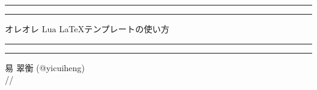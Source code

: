 %
%

\begin{titlepage}
  \centering%
  \vspace*{8\baselineskip}
  \rule{\textwidth}{2pt}\vspace*{-\baselineskip}\vspace*{4pt}
  \rule{\textwidth}{1pt}%
  \vspace*{\baselineskip}%
  {\Huge オレオレ $\mathrm{Lua}$ \LaTeX テンプレートの使い方}%
  \vspace*{0.5\baselineskip}%
  \rule{\textwidth}{1pt}\vspace*{-\baselineskip}\vspace*{5pt}
  \rule{\textwidth}{2pt}%
  \vspace*{20\baselineskip}

  {\Large 易 翠衡 (@yicuiheng)} \\
  {\large \number\year/\number\month/\number\day}
\end{titlepage}
